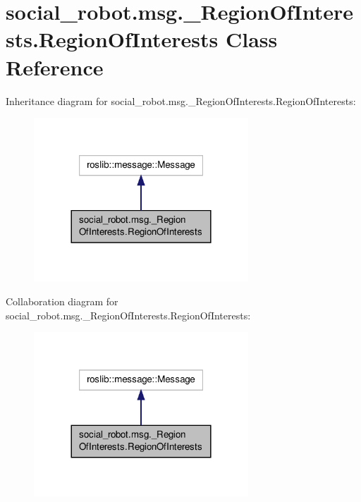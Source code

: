 \hypertarget{classsocial__robot_1_1msg_1_1__RegionOfInterests_1_1RegionOfInterests}{\section{social\-\_\-robot.\-msg.\-\_\-\-Region\-Of\-Interests.\-Region\-Of\-Interests Class Reference}
\label{classsocial__robot_1_1msg_1_1__RegionOfInterests_1_1RegionOfInterests}
}


Inheritance diagram for social\-\_\-robot.\-msg.\-\_\-\-Region\-Of\-Interests.\-Region\-Of\-Interests\-:\nopagebreak
\begin{figure}[H]
\begin{center}
\leavevmode
\includegraphics[width=228pt]{classsocial__robot_1_1msg_1_1__RegionOfInterests_1_1RegionOfInterests__inherit__graph}
\end{center}
\end{figure}


Collaboration diagram for social\-\_\-robot.\-msg.\-\_\-\-Region\-Of\-Interests.\-Region\-Of\-Interests\-:\nopagebreak
\begin{figure}[H]
\begin{center}
\leavevmode
\includegraphics[width=228pt]{classsocial__robot_1_1msg_1_1__RegionOfInterests_1_1RegionOfInterests__coll__graph}
\end{center}
\end{figure}
